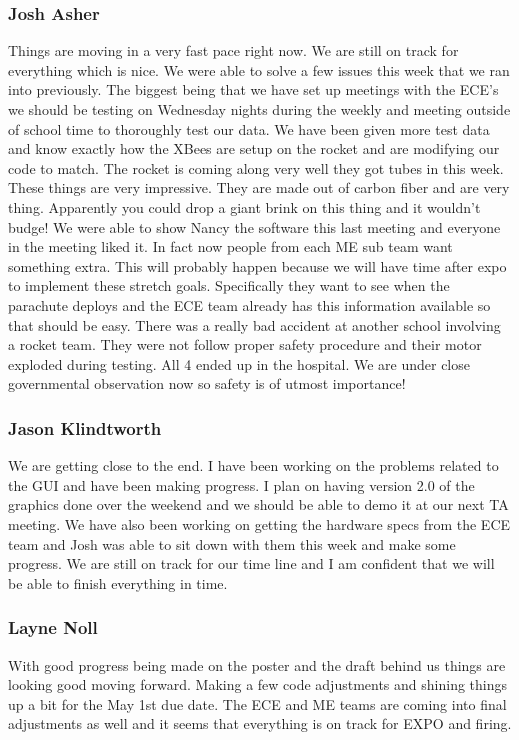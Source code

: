 \documentclass[10pt,draftclsnofoot,onecolumn]{IEEEtran}
\begin{document}
\subsubsection{Josh Asher}
Things are moving in a very fast pace right now. We are still on track for everything which is nice. We were able to solve a few issues this week that we ran into previously. The biggest being that we have set up meetings with the ECE's we should be testing on Wednesday nights during the weekly and meeting outside of school time to thoroughly test our data. We have been given more test data and know exactly how the XBees are setup on the rocket and are modifying our code to match. The rocket is coming along very well they got tubes in this week. These things are very impressive. They are made out of carbon fiber and are very thing. Apparently you could drop a giant brink on this thing and it wouldn't budge! We were able to show Nancy the software this last meeting and everyone in the meeting liked it. In fact now people from each ME sub team want something extra. This will probably happen because we will have time after expo to implement these stretch goals. Specifically they want to see when the parachute deploys and the ECE team already has this information available so that should be easy. There was a really bad accident at another school involving a rocket team. They were not follow proper safety procedure and their motor exploded during testing. All 4 ended up in the hospital. We are under close governmental observation now so safety is of utmost importance! \par

\subsubsection{Jason Klindtworth}
We are getting close to the end. I have been working on the problems related to the GUI and have been making progress. I plan on having version 2.0 of the graphics done over the weekend and we should be able to demo it at our next TA meeting. We have also been working on getting the hardware specs from the ECE team and Josh was able to sit down with them this week and make some progress. We are still on track for our time line and I am confident that we will be able to finish everything in time. \par

\subsubsection{Layne Noll}
With good progress being made on the poster and the draft behind us things are looking good moving forward. Making a few code adjustments and shining things up a bit for the May 1st due date. The ECE and ME teams are coming into final adjustments as well and it seems that everything is on track for EXPO and firing. \par
\end{document}
